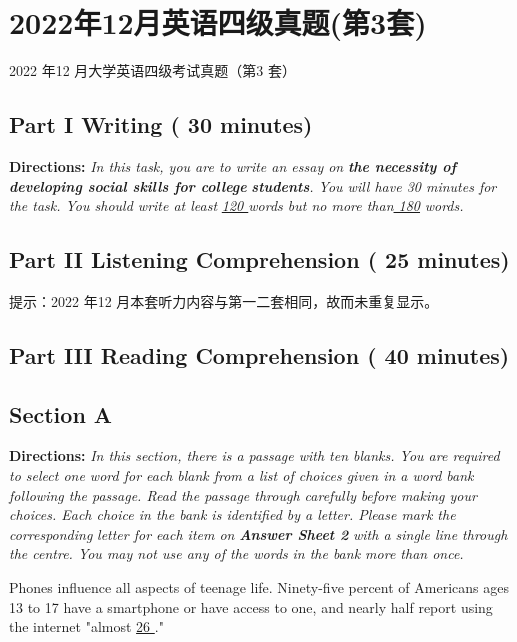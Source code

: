\documentclass[UTF8,11pt]{ctexart}
\begin{document}
\section*{2022年12月英语四级真题(第3套)}
2022 年12 月大学英语四级考试真题（第3 套）


\subsection*{\textbf{Part I Writing} \textbf{( 30 minutes)}}


\textbf{Directions:}\textit{ In this task, you are to write an essay on }\textbf{\textit{the necessity of developing social skills for college}} \textbf{\textit{students}}\textit{. You will have 30 minutes for the task. You should write at least }\textit{\uline{120 }}\textit{words but no more than}\textit{\uline{ 180}} \textit{words.}


\subsection*{\textbf{Part II} \textbf{Listening Comprehension} \textbf{( 25 minutes)}}


提示：2022 年12 月本套听力内容与第一二套相同，故而未重复显示。


\subsection*{\textbf{Part III Reading Comprehension ( 40 minutes)}}


\subsection*{\textbf{Section A}}


\textbf{Directions:} \textit{In this section, there is a passage with ten blanks. You are required to select one word for each} \textit{blank from a list of choices given in a word bank following the passage. Read the passage through carefully} \textit{before making your choices. Each choice in the bank is identified by a letter. Please mark the corresponding} \textit{letter for each item on }\textbf{\textit{Answer Sheet 2}}\textit{ with a single line through the centre. You may not use any of the words} \textit{in the bank more than once.}


Phones influence all aspects of teenage life. Ninety-five percent of Americans ages 13 to 17 have a smartphone or have access to one, and nearly half report using the internet "almost \uline{26 }."
\end{document}
